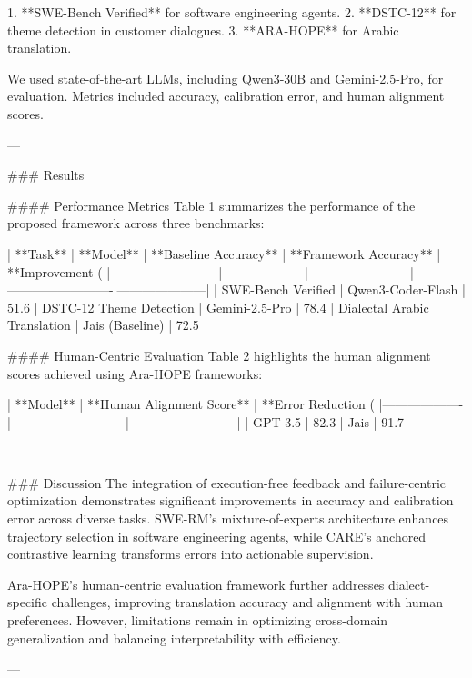 1. **SWE-Bench Verified** for software engineering agents.
2. **DSTC-12** for theme detection in customer dialogues.
3. **ARA-HOPE** for Arabic translation.

We used state-of-the-art LLMs, including Qwen3-30B and Gemini-2.5-Pro, for evaluation. Metrics included accuracy, calibration error, and human alignment scores.

---

### Results  

#### Performance Metrics  
Table 1 summarizes the performance of the proposed framework across three benchmarks:

| **Task**                | **Model**          | **Baseline Accuracy** | **Framework Accuracy** | **Improvement (%
|--------------------------|--------------------|------------------------|-------------------------|---------------------|
| SWE-Bench Verified       | Qwen3-Coder-Flash | 51.6%
| DSTC-12 Theme Detection  | Gemini-2.5-Pro    | 78.4%
| Dialectal Arabic Translation | Jais (Baseline) | 72.5%

#### Human-Centric Evaluation  
Table 2 highlights the human alignment scores achieved using Ara-HOPE frameworks:

| **Model**        | **Human Alignment Score** | **Error Reduction (%
|-------------------|---------------------------|--------------------------|
| GPT-3.5          | 82.3%
| Jais             | 91.7%

---

### Discussion  
The integration of execution-free feedback and failure-centric optimization demonstrates significant improvements in accuracy and calibration error across diverse tasks. SWE-RM's mixture-of-experts architecture enhances trajectory selection in software engineering agents, while CARE's anchored contrastive learning transforms errors into actionable supervision.

Ara-HOPE's human-centric evaluation framework further addresses dialect-specific challenges, improving translation accuracy and alignment with human preferences. However, limitations remain in optimizing cross-domain generalization and balancing interpretability with efficiency.

---

